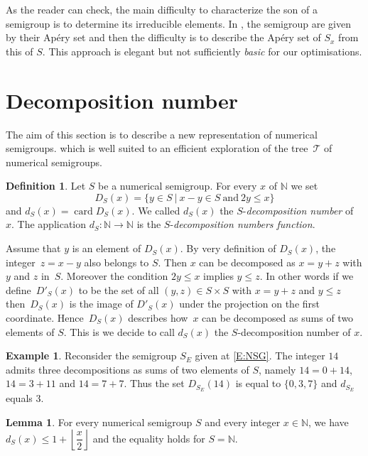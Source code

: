 \documentclass[reqno,11pt]{amsart}
\theoremstyle{plain}
\theoremstyle{definition}
\newtheorem{defi}[prop]{Definition}
\newtheorem{exam}[prop]{Example}
\newtheorem{lem}[prop]{Lemma}
\renewcommand{\leq}{\leqslant}
\newcommand{\NN}{\mathbb{N}}
\DeclareMathOperator{\card}{card}
\begin{document}
As the reader can check, the main difficulty to characterize the son of a semigroup is to determine its irreducible elements.
 In \cite{NumericalSgps}, the semigroup are given by their Ap\'ery set and then the difficulty is to describe the Ap\'ery set of $S_x$  from this of $S$. 
 This approach is elegant but not sufficiently \emph{basic} for our optimisations.



\section{Decomposition number}
\label{S:DecNumber}

The aim of this section is to describe a new representation of numerical semigroups.
which is well suited to an efficient exploration of the tree~$\mathcal{T}$ of numerical semigroups. 

\begin{defi}
Let $S$ be a numerical semigroup.
For every $x$ of $\NN$  we set
\[
D_S(x)=\{y \in S\ |\ x-y\in S\ \text{and}\ 2y\leq x\}
\]
and $d_S(x)=\card D_S(x)$.
We called $d_S(x)$ the $S$-\emph{decomposition number} of~$x$.
The application $d_S:\NN\to\NN$ is the $S$-\emph{decomposition numbers function}.
\end{defi}

Assume that $y$ is an element of $D_S(x)$.
By very definition of $D_S(x)$, the integer~$z=x-y$ also belongs to $S$. 
Then $x$ can be decomposed as $x=y+z$ with $y$ and $z$ in~$S$. 
Moreover the condition $2y\leq x$ implies $y\leq z$. 
In other words if we define~$D'_S(x)$ to be the set of all $(y,z)\in S\times S$ with $x=y+z$ and $y\leq z$ then~$D_S(x)$ is the image of $D'_S(x)$ under the projection on the first coordinate.
 Hence~$D_S(x)$ describes how~$x$ can be decomposed as sums of two elements of $S$.
 This is we decide to call $d_S(x)$ the $S$-decomposition number of $x$.

\begin{exam}
Reconsider the semigroup $S_E$ given at \eqref{E:NSG}.
The integer $14$ admits three decompositions as sums of two elements of $S$, namely $14=0+14$, $14=3+11$ and $14=7+7$. 
Thus the set $D_{S_E}(14)$ is equal to $\{0,3,7\}$ and $d_{S_E}$ equals $3$.
\end{exam}


\begin{lem}
\label{L:RepN}
For every numerical semigroup $S$ and every integer $x\in \NN$,  we have $d_S(x)\leq 1+\left\lfloor \dfrac{x}2\right\rfloor$ and the equality holds for $S=\NN$.
\end{lem}
\end{document}
